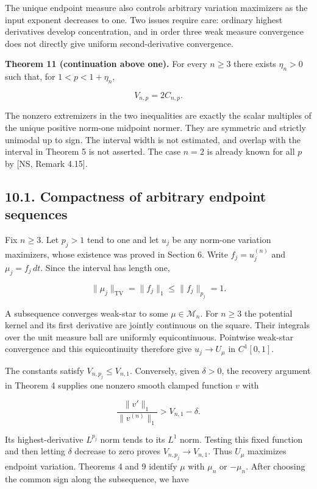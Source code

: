 \documentclass[11pt]{article}
\begin{document}
The unique endpoint measure also controls arbitrary variation maximizers
as the input exponent decreases to one. Two issues require care:
ordinary highest derivatives develop concentration, and in order three
weak measure convergence does not directly give uniform
second-derivative convergence.

\textbf{Theorem 11 (continuation above one).} For every \(n\ge3\) there
exists \(\eta_n>0\) such that, for \(1<p<1+\eta_n\),

\[
V_{n,p}=2C_{n,p}.
\tag{10.1}
\]

The nonzero extremizers in the two inequalities are exactly the scalar
multiples of the unique positive norm-one midpoint normer. They are
symmetric and strictly unimodal up to sign. The interval width is not
estimated, and overlap with the interval in Theorem 5 is not asserted.
The case \(n=2\) is already known for all \(p\) by {[}NS, Remark
4.15{]}.

\subsection{10.1. Compactness of arbitrary endpoint
sequences}\label{compactness-of-arbitrary-endpoint-sequences}

Fix \(n\ge3\). Let \(p_j>1\) tend to one and let \(u_j\) be any norm-one
variation maximizers, whose existence was proved in Section 6. Write
\(f_j=u_j^{(n)}\) and \(\mu_j=f_j\,dt\). Since the interval has length
one,

\[
\|\mu_j\|_{\mathrm{TV}}=\|f_j\|_1\le\|f_j\|_{p_j}=1.
\]

A subsequence converges weak-star to some \(\mu\in\mathcal M_n\). For
\(n\ge3\) the potential kernel and its first derivative are jointly
continuous on the square. Their integrals over the unit measure ball are
uniformly equicontinuous. Pointwise weak-star convergence and this
equicontinuity therefore give \(u_j\to U_\mu\) in \(C^1[0,1]\).

The constants satisfy \(V_{n,p_j}\le V_{n,1}\). Conversely, given
\(\delta>0\), the recovery argument in Theorem 4 supplies one nonzero
smooth clamped function \(v\) with

\[
\frac{\|v'\|_1}{\|v^{(n)}\|_1}>V_{n,1}-\delta.
\]

Its highest-derivative \(L^{p_j}\) norm tends to its \(L^1\) norm.
Testing this fixed function and then letting \(\delta\) decrease to zero
proves \(V_{n,p_j}\to V_{n,1}\). Thus \(U_\mu\) maximizes endpoint
variation. Theorems 4 and 9 identify \(\mu\) with \(\mu_n\) or
\(-\mu_n\). After choosing the common sign along the subsequence, we
have
\end{document}
